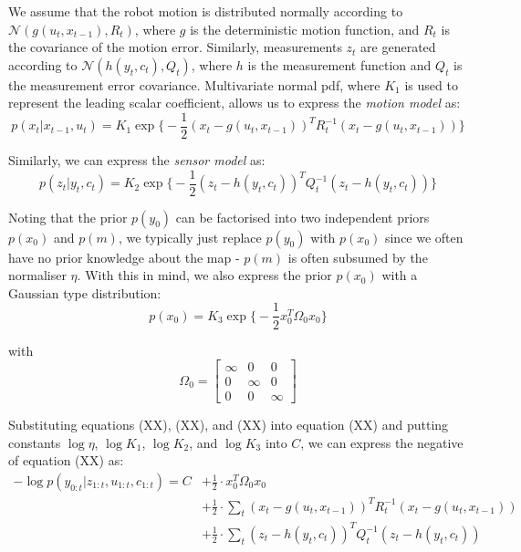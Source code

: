 \documentclass[a4paper]{article}
\begin{document}
We assume that the robot motion is distributed normally according to $\mathcal{N}(g(u_t, x_{t-1}), R_t)$, where $g$ is the deterministic motion function, and $R_t$ is the covariance of the motion error. Similarly, measurements $z_t$ are generated according to $\mathcal{N}(h(y_t, c_t), Q_t)$, where $h$ is the measurement function and $Q_t$ is the measurement error covariance. Multivariate normal pdf, where $K_1$ is used to represent the leading scalar coefficient, allows us to express the \textit{motion model} as:
\begin{equation}
p(x_t|x_{t-1}, u_t) = K_1 \exp \bigg\{ -\frac{1}{2}(x_t - g(u_t, x_{t-1}))^T R_t^{-1} (x_t - g(u_t, x_{t-1})) \bigg\}
\end{equation}

Similarly, we can express the \textit{sensor model} as:
\begin{equation}
p(z_t|y_t, c_t) = K_2 \exp \bigg\{ -\frac{1}{2}(z_t - h(y_t,c_t))^T Q_t^{-1} (z_t - h(y_t,c_t)) \bigg\}
\end{equation}

Noting that the prior $p(y_0)$ can be factorised into two independent priors $p(x_0)$ and $p(m)$, we typically just replace $p(y_0)$ with $p(x_0)$ since we often have no prior knowledge about the map - $p(m)$ is often subsumed by the normaliser $\eta$. With this in mind, we also express the prior $p(x_0)$ with a Gaussian type distribution:
\begin{equation}
p(x_0) = K_3 \exp \bigg\{ -\frac{1}{2} x_0^T \Omega_0 x_0 \bigg\}
\end{equation}

with
\begin{equation}
\Omega_0 =
\begin{bmatrix}
\infty & 0      & 0 \\
0 	   & \infty & 0 \\
0 	   & 0 		& \infty
\end{bmatrix}
\end{equation}

Substituting equations (XX), (XX), and (XX) into equation (XX) and putting constants $\log \eta$, $\log K_1$, $\log K_2$, and $\log K_3$ into $C$, we can express the negative of equation (XX) as:
\begin{align}
-\log p(y_{0:t}|z_{1:t}, u_{1:t}, c_{1:t}) = C &+ \frac{1}{2} \cdot x_0^T \Omega_0 x_0 \nonumber \\ &+ \frac{1}{2} \cdot \sum_{t} (x_t - g(u_t, x_{t-1}))^T R_t^{-1} (x_t - g(u_t, x_{t-1})) \nonumber \\ &+ \frac{1}{2} \cdot \sum_{t} (z_t - h(y_t,c_t))^T Q_t^{-1} (z_t - h(y_t,c_t))
\end{align}
\end{document}
